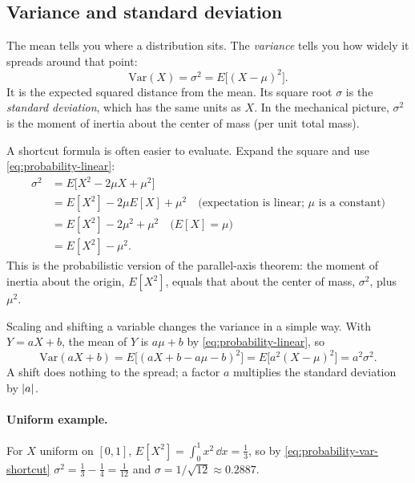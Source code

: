 \subsection{Variance and standard deviation}

The mean tells you where a distribution sits. The \emph{variance} tells you how widely it spreads around that point:
\begin{equation}
\mathrm{Var}(X) = \sigma^2 = E\bigl[(X-\mu)^2\bigr].
\label{eq:probability-var}
\end{equation}
It is the expected squared distance from the mean. Its square root $\sigma$ is the \emph{standard deviation}, which has the same units as $X$. In the mechanical picture, $\sigma^2$ is the moment of inertia about the center of mass (per unit total mass).

A shortcut formula is often easier to evaluate. Expand the square and use \cref{eq:probability-linear}:
\begin{align}
\sigma^2 &= E\bigl[X^2 - 2\mu X + \mu^2\bigr]\nonumber\\
&= E[X^2] - 2\mu E[X] + \mu^2 \quad\text{(expectation is linear; $\mu$ is a constant)}\nonumber\\
&= E[X^2] - 2\mu^2 + \mu^2 \quad\text{($E[X]=\mu$)}\nonumber\\
&= E[X^2] - \mu^2 .
\label{eq:probability-var-shortcut}
\end{align}
This is the probabilistic version of the parallel-axis theorem: the moment of inertia about the origin, $E[X^2]$, equals that about the center of mass, $\sigma^2$, plus $\mu^2$.

Scaling and shifting a variable changes the variance in a simple way. With $Y=aX+b$, the mean of $Y$ is $a\mu+b$ by \cref{eq:probability-linear}, so
\begin{equation}
\mathrm{Var}(aX+b) = E\bigl[(aX+b-a\mu-b)^2\bigr] = E\bigl[a^2(X-\mu)^2\bigr] = a^2\sigma^2 .
\label{eq:probability-var-scale}
\end{equation}
A shift does nothing to the spread; a factor $a$ multiplies the standard deviation by $\left\lvert a\right\rvert$.

\paragraph{Uniform example.} For $X$ uniform on $[0,1]$, $E[X^2]=\int_0^1x^2\,\dd x=\tfrac13$, so by \cref{eq:probability-var-shortcut} $\sigma^2=\tfrac13-\tfrac14=\tfrac1{12}$ and $\sigma=1/\sqrt{12}\approx0.2887$.

